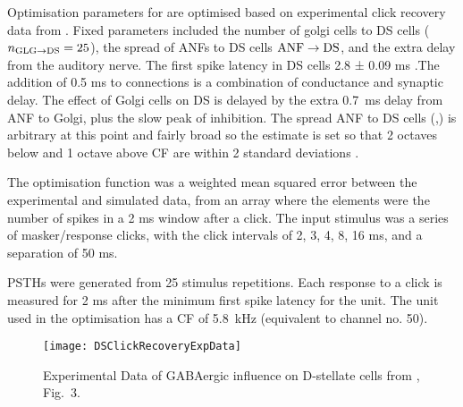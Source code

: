 Optimisation parameters for \GLGDS are optimised based on experimental
click recovery data from \citep{BackoffPalombiEtAl:1997}.  Fixed
parameters included the number of golgi cells to DS cells ($\protect n_{\protect\textrm{{GLG}}\to\textrm{{DS}}} =
25$), the spread of ANFs to DS cells $\protect\textrm{{ANF}}\to\textrm{{DS}}$, and the extra delay
from the auditory nerve.  The first spike latency in DS cells 2.8 ±
0.09 ms \citep{RhodeSmith:1986}.The addition of 0.5 ms to \ANFDS
connections is a combination of conductance and synaptic delay. The
effect of Golgi cells on DS is delayed by the extra 0.7~ms delay from
ANF to Golgi, plus the slow peak of \GABAa inhibition.  The spread ANF
to DS cells (\sANFDSh,\sANFDSl) is arbitrary at this point and fairly
broad so the estimate is set so that 2 octaves below and 1 octave
above CF are within 2 standard deviations \citep{PaoliniClark:1999}.
\medskip{}

The optimisation function was a weighted mean squared error between
the experimental and simulated data, from an array where the elements
were the number of spikes in a 2 ms window after a click.  The input
stimulus was a series of masker/response clicks, with the click
intervals of 2, 3, 4, 8, 16 ms, and a separation of 50 ms.


 PSTHs were generated from 25
   stimulus repetitions. Each response to a click is measured for 2 ms
   after the minimum first spike latency for the unit.  The unit  used
   in the optimisation has a CF of 5.8~kHz (equivalent to channel no. 50).






\clearpage

\begin{figure}[htb]
\centering
\texttt{[image: DSClickRecoveryExpData]}
\caption{Experimental Data of GABAergic influence on D-stellate cells from \citep{BackoffPalombiEtAl:1997}, Fig.~3.}\label{Ch3:fig:DSClickRecoveryExpData}
\end{figure}

